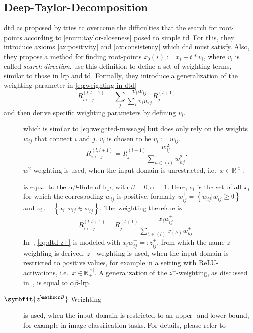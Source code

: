 \subsection{Deep-Taylor-Decomposition}\label{subsect:dtd}
\gls{dtd} as proposed by  tries to overcome the difficulties that the search for root-points according to \cref{enum:taylor-closeness} posed to simple \gls{td}. For this, they introduce axioms \ref{ax:positivity} and \ref{ax:consistency} which \gls{dtd} must satisfy. Also, they propose a method for finding root-points \(x_0(i):= x_i + t*v_i\), where \(v_i\) is called \textit{search direction}. \citeauthor{Montavon.2017} use this definition to define a set of weighting terms, similar to those in \gls{lrp} and \gls{td}. Formally, they introduce a generalization of the weighting parameter in \cref{eq:weighting-in-dtd}\cite[see][Supplementary Material]{Montavon.2017}
\begin{equation}
    R_{i\leftarrow j}^{(l,l+1)} = \sum_j \frac{v_i w_{ij}}{\sum_i v_i w_{ij}} R_j^{(l+1)}\label{eq:weighting-in-dtd}
\end{equation}
and then derive specific weighting parameters by defining \(v_i\).
\begin{description}
    \item[] which is similar to \cref{eq:weighted-message} but does only rely on the weights \(w_{ij}\) that connect \(i \text{ and } j\). \(v_i\) is chosen to be \(v_i:=w_{ij}\).
    \begin{equation}
        R_{i\leftarrow j}^{(l,l+1)} = R_{j}^{(l+1)} \frac{w_{ij}^2}{\sum_{h\in (l)} w_{hj}^2}.\label{eq:w2-weighting-dtd}
    \end{equation}
    \(w^2\)-weighting is used, when the input-domain is unrestricted, i.e.\ \(x\in \mathbb R^{|x|}\).
    \item[] is equal to the \(\alpha\beta\)-Rule of \gls{lrp}, with \(\beta=0, \alpha=1\). Here, \(v_i\) is the set of all \(x_i\) for which the correspoding \(w_{ij}\) is positive, formally \(w_{ij}^{+} = \left\{w_{ij} | w_{ij}\geq 0\right\}\) and \(v_i:=\left\{x_i|w_{ij}\in w_{ij}^{+}\right\}\). The weighting therefore is
    \begin{equation}
        R_{i\leftarrow j}^{(l,l+1)} = R_{j}^{(l+1)} \frac{x_i w_{ij}^{+}}{\sum_{h\in (l)} x_(h) w_{hj}^{+}}.\label{eq:dtd-z+}
    \end{equation}
    In~\cite{Montavon.2017}, \cref{eq:dtd-z+} is modeled with \(x_i w_{ij}^{+}=:z_{ij}^{+}\), from which the name \(z^{+}\)-weighting is derived.
    \(z^{+}\)-weighting is used, when the input-domain is restricted to positive values, for example in a setting with ReLU-activations, i.e.\ \(x\in \mathbb R_{+}^{|x|}\). A generalization of the \(z^{+}\)-weighting, as discussed in~\cite{Montavon.2017}, is equal to \(\alpha\beta\)-\gls{lrp}.
    \item[\(\symbfit{z^{\mathscr B}}\)-Weighting] is used, when the input-domain is restricted to an upper- and lower-bound, for example in image-classification tasks. For details, please refer to~\cite[215\psq]{Montavon.2017}
\end{description}
